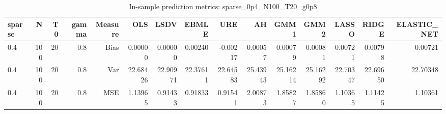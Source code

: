 \begin{table}[!htbp]\centering
\caption{In-sample prediction metrics: sparse_0p4_N100_T20_g0p8}
\label{tab:table2_sparse_0p4_N100_T20_g0p8}
\begin{tabular}{lrrrrrrrrrrrrrr}
\hline
sparse & N & T0 & gamma & Measure & OLS & LSDV & EBMLE & URE & AH & GMM1 & GMM2 & LASSO & RIDGE & ELASTIC_NET \\
\hline
0.4 & 100 & 20 & 0.8 & Bias & 0.00000 & 0.00000 & 0.00240 & -0.00217 & 0.00057 & 0.00079 & 0.00081 & 0.00721 & 0.00798 & 0.00721 \\
0.4 & 100 & 20 & 0.8 & Var & 22.68426 & 22.90971 & 22.37611 & 22.64583 & 25.43943 & 25.16214 & 25.16292 & 22.70347 & 22.69650 & 22.70348 \\
0.4 & 100 & 20 & 0.8 & MSE & 1.13965 & 0.91433 & 0.91833 & 0.91541 & 2.00873 & 1.85827 & 1.85860 & 1.10365 & 1.11425 & 1.10361 \\
\hline
\end{tabular}
\end{table}

